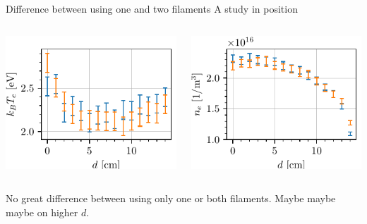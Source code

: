 \documentclass[10pt]{beamer}
\begin{document}
\begin{frame}{Difference between using one and two filaments}
    {A study in position}
    \begin{columns}
        \centering
        \includegraphics[scale=1]{../figures/temperatureeV_position_twofilaments.pdf}

        \centering
        \includegraphics[scale=1]{../figures/density_position_twofilaments.pdf}

    \end{columns}
    \vspace{0.5cm}
    No great difference between using only one or both filaments.
    Maybe maybe maybe on higher $d$.
\end{frame}
\end{document}

